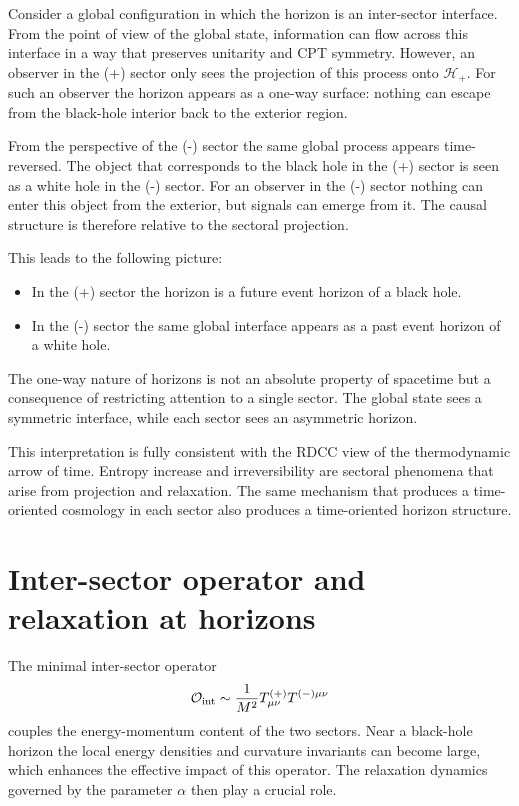 \documentclass[11pt,a4paper]{article}
\begin{document}
Consider a global configuration in which the horizon is an inter-sector interface. From the point of view of the global state, information can flow across this interface in a way that preserves unitarity and CPT symmetry. However, an observer in the (+) sector only sees the projection of this process onto \(\mathcal{H}_{+}\). For such an observer the horizon appears as a one-way surface: nothing can escape from the black-hole interior back to the exterior region.

From the perspective of the (-) sector the same global process appears time-reversed. The object that corresponds to the black hole in the (+) sector is seen as a white hole in the (-) sector. For an observer in the (-) sector nothing can enter this object from the exterior, but signals can emerge from it. The causal structure is therefore relative to the sectoral projection.

This leads to the following picture:
\begin{itemize}
    \item In the (+) sector the horizon is a future event horizon of a black hole.
    \item In the (-) sector the same global interface appears as a past event horizon of a white hole.
\end{itemize}
The one-way nature of horizons is not an absolute property of spacetime but a consequence of restricting attention to a single sector. The global state sees a symmetric interface, while each sector sees an asymmetric horizon.

This interpretation is fully consistent with the RDCC view of the thermodynamic arrow of time. Entropy increase and irreversibility are sectoral phenomena that arise from projection and relaxation. The same mechanism that produces a time-oriented cosmology in each sector also produces a time-oriented horizon structure.

\section{Inter-sector operator and relaxation at horizons}

The minimal inter-sector operator
\begin{equation}
\mathcal{O}_{\rm int} \sim \frac{1}{M^{2}} T^{(+)}_{\mu\nu} T^{(-)\mu\nu}
\end{equation}
couples the energy-momentum content of the two sectors. Near a black-hole horizon the local energy densities and curvature invariants can become large, which enhances the effective impact of this operator. The relaxation dynamics governed by the parameter \(\alpha\) then play a crucial role.
\end{document}
